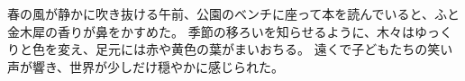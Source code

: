\documentclass[a4paper]{jarticle}
\begin{document}
春の風が静かに吹き抜ける午前、公園のベンチに座って本を読んでいると、ふと金木犀の香りが鼻をかすめた。
季節の移ろいを知らせるように、木々はゆっくりと色を変え、足元には赤や黄色の葉がまいおちる。
遠くで子どもたちの笑い声が響き、世界が少しだけ穏やかに感じられた。
\end{document}

